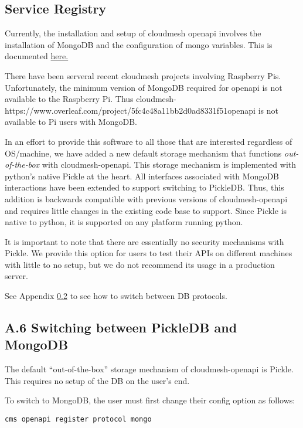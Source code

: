 \subsection{Service Registry}
\label{sec:registry}

Currently, the installation and setup of cloudmesh openapi involves
the installation of MongoDB and the configuration of mongo
variables. This is documented
\href{https://github.com/cloudmesh/cloudmesh-openapi\#installation}{here.}

There have been serveral recent cloudmesh projects involving Raspberry
Pis. Unfortunately, the minimum version of MongoDB required for
openapi is not available to the Raspberry Pi. Thus
cloudmesh-https://www.overleaf.com/project/5fc4c48a11bb2d0ad8331f51openapi
is not available to Pi users with MongoDB.

In an effort to provide this software to all those that are interested
regardless of OS/machine, we have added a new default storage
mechanism that functions {\em out-of-the-box} with
cloudmesh-openapi. This storage mechanism is implemented with python's
native Pickle at the heart. All interfaces associated with MongoDB
interactions have been extended to support switching to
PickleDB. Thus, this addition is backwards compatible with previous
versions of cloudmesh-openapi and requires little changes in the
existing code base to support. Since Pickle is native to python, it is
supported on any platform running python.

It is important to note that there are essentially no security
mechanisms with Pickle. We provide this option for users to test their
APIs on different machines with little to no setup, but we do not
recommend its usage in a production server.

See Appendix \ref{a.6-switching-between-pickledb-and-mongodb} 
to see how to switch between DB protocols.

\subsection{A.6 Switching between PickleDB and
MongoDB}\label{a.6-switching-between-pickledb-and-mongodb}

The default ``out-of-the-box'' storage mechanism of cloudmesh-openapi is
Pickle. This requires no setup of the DB on the user's end.

To switch to MongoDB, the user must first change their config option as
follows:

\begin{verbatim}
cms openapi register protocol mongo
\end{verbatim}

